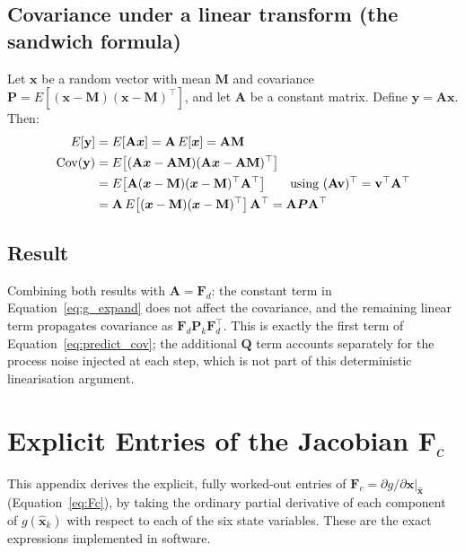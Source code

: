 \documentclass[12pt,a4paper]{article}
\newcommand{\bx}{\bm{x}}
\newcommand{\bF}{\bm{F}}
\newcommand{\bP}{\bm{P}}
\newcommand{\bQ}{\bm{Q}}
\begin{document}
{\subsection{Covariance under a linear transform (the sandwich formula)}
\label{app:sandwich_formula}
Let $\bx$ be a random vector with mean $\mathbf{M}$ and covariance
$\bP = E[(\bx-\mathbf{M})(\bx-\mathbf{M})^\top]$, and let $\mathbf{A}$ be
a constant matrix. Define $\mathbf{y} = \mathbf{A}\bx$. Then:
\begin{align}
  E[\mathbf{y}] &= E[\mathbf{A}\bx] = \mathbf{A}\,E[\bx] = \mathbf{A}\mathbf{M} \\
  \mathrm{Cov}(\mathbf{y}) &= E\big[(\mathbf{A}\bx - \mathbf{A}\mathbf{M})(\mathbf{A}\bx - \mathbf{A}\mathbf{M})^\top\big] \notag \\
                     &= E\big[\mathbf{A}(\bx-\mathbf{M})(\bx-\mathbf{M})^\top \mathbf{A}^\top\big]
                        \qquad \text{using } (\mathbf{A}\mathbf{v})^\top = \mathbf{v}^\top\mathbf{A}^\top \notag \\
                     &= \mathbf{A}\,E\big[(\bx-\mathbf{M})(\bx-\mathbf{M})^\top\big]\,\mathbf{A}^\top
                        = \mathbf{A}\bP\mathbf{A}^\top
\end{align}

\subsection{Result}

Combining both results with $\mathbf{A} = \bF_d$: the constant term in
Equation~\eqref{eq:g_expand} does not affect the covariance, and the
remaining linear term propagates covariance as $\bF_d\bP_k\bF_d^\top$.
This is exactly the first term of Equation~\eqref{eq:predict_cov}; the
additional $\bQ$ term accounts separately for the process noise injected
at each step, which is not part of this deterministic linearisation
argument.

\section{Explicit Entries of the Jacobian \texorpdfstring{$\bF_c$}{Fc}}
\label{app:Fc-entries}

This appendix derives the explicit, fully worked-out entries of
$\bF_c = \partial g/\partial \bx|_{\hat{\bx}}$ (Equation~\eqref{eq:Fc}),
by taking the ordinary partial derivative of each component of
$g(\hat{\bx}_k)$ with respect to each of the six state variables. These
are the exact expressions implemented in software.

}
\end{document}
